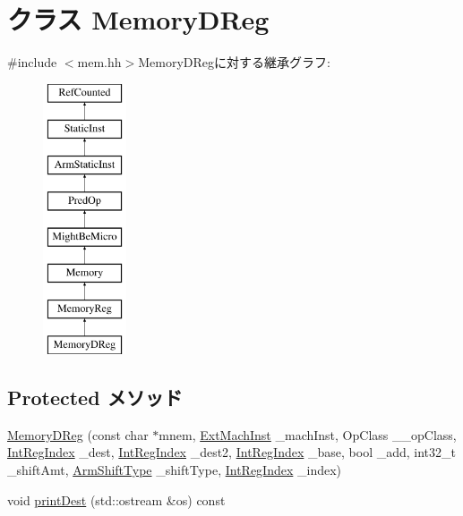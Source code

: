 \hypertarget{classArmISA_1_1MemoryDReg}{
\section{クラス MemoryDReg}
\label{classArmISA_1_1MemoryDReg}
}


{\ttfamily \#include $<$mem.hh$>$}MemoryDRegに対する継承グラフ:\begin{figure}[H]
\begin{center}
\leavevmode
\includegraphics[height=8cm]{classArmISA_1_1MemoryDReg}
\end{center}
\end{figure}
\subsection*{Protected メソッド}
\begin{DoxyCompactItemize}
\item 
\hyperlink{classArmISA_1_1MemoryDReg_a0033dd16629fb32e26c385ad8c9615e3}{MemoryDReg} (const char $\ast$mnem, \hyperlink{classStaticInst_a5605d4fc727eae9e595325c90c0ec108}{ExtMachInst} \_\-machInst, OpClass \_\-\_\-opClass, \hyperlink{namespaceArmISA_ae64680ba9fb526106829d6bf92fc791b}{IntRegIndex} \_\-dest, \hyperlink{namespaceArmISA_ae64680ba9fb526106829d6bf92fc791b}{IntRegIndex} \_\-dest2, \hyperlink{namespaceArmISA_ae64680ba9fb526106829d6bf92fc791b}{IntRegIndex} \_\-base, bool \_\-add, int32\_\-t \_\-shiftAmt, \hyperlink{namespaceArmISA_a209d79feaaef0aa2f54ae62e53ee90de}{ArmShiftType} \_\-shiftType, \hyperlink{namespaceArmISA_ae64680ba9fb526106829d6bf92fc791b}{IntRegIndex} \_\-index)
\item 
void \hyperlink{classArmISA_1_1MemoryDReg_adee5df6e5d6b0c498363aabda42431fa}{printDest} (std::ostream \&os) const 
\end{DoxyCompactItemize}
